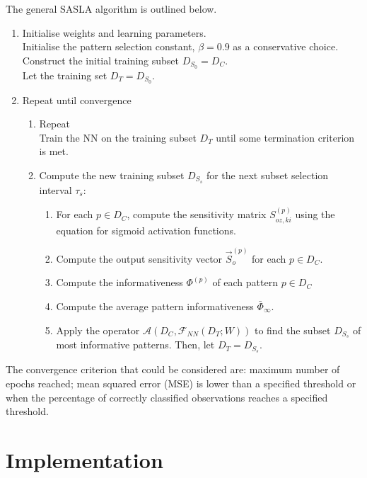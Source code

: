 \documentclass[conference]{IEEEtran}
\begin{document}
	The general SASLA algorithm is outlined below.
	\begin{enumerate}
		\item Initialise weights and learning parameters. \\
		Initialise the pattern selection constant, $\beta=0.9$ as a conservative choice. \\
		Construct the initial training subset $D_{S_0} = D_C$. \\
		Let the training set $D_T=D_{S_0}$.\\
		\item Repeat until convergence
		\begin{enumerate}
		\item Repeat \\
		Train the NN on the training subset $D_T$ until some termination criterion is met.
		\item Compute the new training subset $D_{S_s}$ for the next subset selection interval $\tau_s$:
		\begin{enumerate}
		\item For each $p\in D_C$, compute the sensitivity matrix $S_{oz,ki}^{(p)}$ using the equation for sigmoid activation functions.
		\item Compute the output sensitivity vector $\vec{S}_o^{(p)}$ for each $p\in D_C$.
		\item Compute the informativeness $\Phi^{(p)}$ of each pattern $p\in D_C$
		\item Compute the average pattern informativeness $\bar{\Phi}_\infty$.
		\item Apply the operator $\mathcal{A}(D_C, \mathcal{F}_{NN}(D_T;W))$ to find the subset $D_{S_s}$ of most informative patterns. Then, let $D_T=D_{S_s}$.
		\end{enumerate}
		\end{enumerate}
	\end{enumerate}
	The convergence criterion that could be considered are: maximum number of epochs reached; mean squared error (MSE) is lower than a specified threshold or when the percentage of correctly classified observations reaches a specified threshold.
	
	\section{Implementation}\label{I}
	
\end{document}
